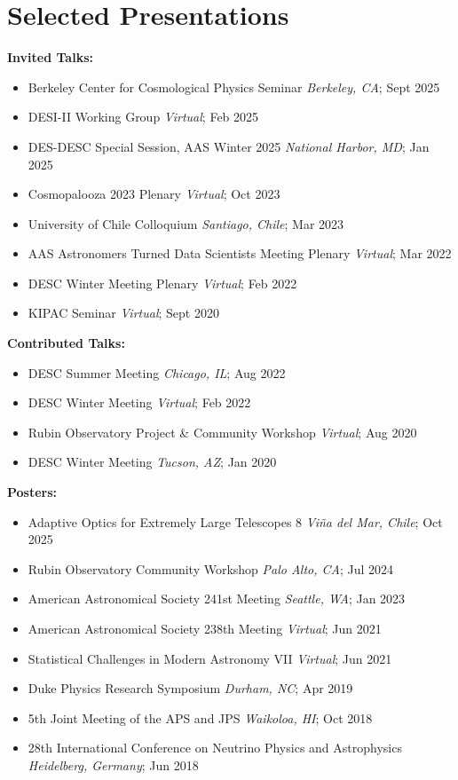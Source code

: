 \section{Selected Presentations}

\textbf{Invited Talks:}
\begin{itemize}
    \item Berkeley Center for Cosmological Physics Seminar \hfill \textit{Berkeley, CA}; Sept 2025
    \item DESI-II Working Group \hfill \textit{Virtual}; Feb 2025
    \item DES-DESC Special Session, AAS Winter 2025 \hfill \textit{National Harbor, MD}; Jan 2025
    \item Cosmopalooza 2023 Plenary \hfill \textit{Virtual}; Oct 2023    
    \item University of Chile Colloquium \hfill \textit{Santiago, Chile}; Mar 2023
    \item AAS Astronomers Turned Data Scientists Meeting Plenary \hfill \textit{Virtual}; Mar 2022
    \item DESC Winter Meeting Plenary \hfill \textit{Virtual}; Feb 2022
    \item KIPAC Seminar \hfill \textit{Virtual}; Sept 2020
\end{itemize}

\textbf{Contributed Talks:}
\begin{itemize}
    \item DESC Summer Meeting \hfill \textit{Chicago, IL}; Aug 2022
    \item DESC Winter Meeting \hfill \textit{Virtual}; Feb 2022
    \item Rubin Observatory Project \& Community Workshop \hfill \textit{Virtual}; Aug 2020
    \item DESC Winter Meeting \hfill \textit{Tucson, AZ}; Jan 2020
\end{itemize}

\textbf{Posters:}
\begin{itemize}
    \item Adaptive Optics for Extremely Large Telescopes 8 \hfill \textit{Vi\~{n}a del Mar, Chile}; Oct 2025
    \item Rubin Observatory Community Workshop \hfill \textit{Palo Alto, CA}; Jul 2024
    \item American Astronomical Society 241st Meeting \hfill \textit{Seattle, WA}; Jan 2023
    \item American Astronomical Society 238th Meeting \hfill \textit{Virtual}; Jun 2021
    \item Statistical Challenges in Modern Astronomy VII \hfill \textit{Virtual}; Jun 2021
    \item Duke Physics Research Symposium \hfill \textit{Durham, NC}; Apr 2019
    \item 5th Joint Meeting of the APS and JPS \hfill \textit{Waikoloa, HI}; Oct 2018
    \item 28th International Conference on Neutrino Physics and Astrophysics \hfill \textit{Heidelberg, Germany}; Jun 2018
\end{itemize}